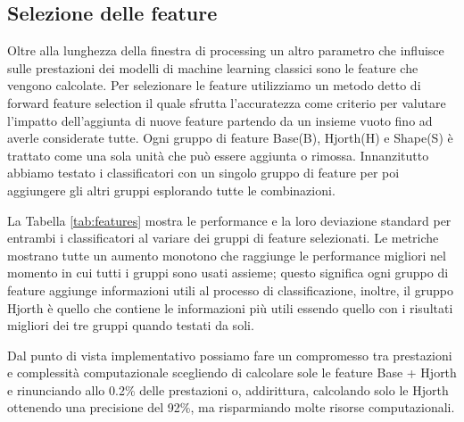\subsection{Selezione delle feature}
\label{ssec:selezione-delle-feature}

Oltre alla lunghezza della finestra di processing un altro parametro che influisce sulle prestazioni dei modelli di machine learning classici sono le feature che vengono calcolate. Per selezionare le feature utilizziamo un metodo detto di forward feature selection il quale sfrutta l'accuratezza come criterio per valutare l'impatto dell'aggiunta di nuove feature partendo da un insieme vuoto fino ad averle considerate tutte. Ogni gruppo di feature Base(B), Hjorth(H) e Shape(S) è trattato come una sola unità che può essere aggiunta o rimossa. Innanzitutto abbiamo testato i classificatori con un singolo gruppo di feature per poi aggiungere gli altri gruppi esplorando tutte le combinazioni.

La Tabella \ref{tab:features} mostra le performance e la loro deviazione standard per entrambi i classificatori al variare dei gruppi di feature selezionati. Le metriche mostrano tutte un aumento monotono che raggiunge le performance migliori nel momento in cui tutti i gruppi sono usati assieme; questo significa ogni gruppo di feature aggiunge informazioni utili al processo di classificazione, inoltre, il gruppo Hjorth è quello che contiene le informazioni più utili essendo quello con  i risultati migliori dei tre gruppi quando testati da soli. 

Dal punto di vista implementativo possiamo fare un compromesso tra prestazioni e complessità computazionale scegliendo di calcolare sole le feature Base + Hjorth e rinunciando allo 0.2\% delle prestazioni o, addirittura, calcolando solo le Hjorth ottenendo una precisione del 92\%, ma risparmiando molte risorse computazionali.

